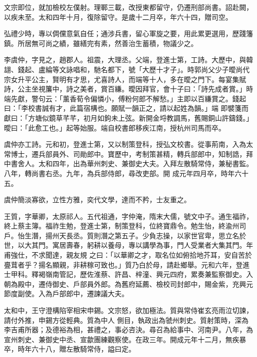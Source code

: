\begin{pinyinscope}
 文宗即位，就加檢校左僕射。理鄆三載，改授東都留守，仍遷刑部尚書。詔赴闕，以疾未至。太和四年十月，復除留守。是歲十二月卒，年六十四，贈司空。



 弘禮少時，專以倜儻意氣自任；通涉兵書，留心軍旋之要，用此累更選用，歷踐籓鎮。所居無可尚之績，雖繕完有素，然善治生蓄積，物議少之。



 李虞仲，字見之，趙郡人。祖震，大理丞。父端，登進士第，工詩。大歷中，與韓翃、錢起、盧綸等文詠唱和，馳名都下，號「大歷十才子」。時郭尚父少子曖尚代宗女升平公主，賢明有才思，尤喜詩人，而端等十人，多在曖之門下。每宴集賦詩，公主坐視簾中，詩之美者，賞百縑。曖因拜官，會十子曰：「詩先成者賞。」時端先獻，警句云：「薰香荀令偏憐小，傅粉何郎不解愁。」主即以百縑賞之。錢起曰：「李校書誠有才，此篇宿構也。願賦一韻正之，請以起姓為韻。」端
 即襞箋而獻曰：「方塘似鏡草芊芊，初月如鉤未上弦。新開金埒教調馬，舊賜銅山許鑄錢。」曖曰：「此愈工也。」起等始服。端自校書郎移疾江南，授杭州司馬而卒。



 虞仲亦工詩。元和初，登進士第，又以制策登科，授弘文校書。從事荊南，入為太常博士，遷兵部員外、司勛郎中。寶歷中，考制策甚精，轉兵部郎中，知制誥，拜中書舍人。太和四年，出為華州刺史、兼御史大夫。入拜左散騎常侍，兼秘書監。八年，轉尚書右丞。九年，為兵部侍郎，尋改吏部。開
 成元年四月卒，時年六十五。



 虞仲簡淡寡欲，立性方雅，奕代文學，達而不矜，士友重之。



 王質，字華卿，太原祁人。五代祖通，字仲淹，隋末大儒，號文中子。通生福祚，終上蔡主簿。福祚生勉，登進士第，制策登科，位終寶鼎令。勉生怡，終渝州司戶。怡生潛，揚州天長丞。質則潛之第五子。少負志操，以家世官卑，思立名於世，以大其門。寓居壽春，躬耕以養母，專以講學為事，門人受業者大集其門。年甫強仕，不求聞達，親友規
 之曰：「以華卿之才，取名位如俯拾地芥耳，安自苦於亹茸者乎？揚名顯親，非耕稼可致也。」質乃白於母，請赴鄉舉。元和六年，登進士甲科。釋褐嶺南管記，歷佐淮蔡、許昌、梓潼、興元四府，累奏兼監察御史。入朝為殿中，遷侍御史、戶部員外郎。為舊府延薦、檢校司封郎中，賜金紫，充興元節度副使。入為戶部郎中，遷諫議大夫。



 太和中，王守澄構陷宰相宋申錫。文宗怒，欲加極法。質與常侍崔玄亮雨泣切諫，請付外推，申錫方從輕典。質為中人
 側目，執政出為虢州刺史。質射策時，深為李吉甫所器；及德裕為相，甚禮之，事必咨決。尋召為給事中、河南尹。八年，為宣州刺史、兼御史中丞、宣歙團練觀察使。在政三年。開成元年十二月，無疾暴卒，時年六十八，贈左散騎常侍，謚曰定。




\end{pinyinscope}
